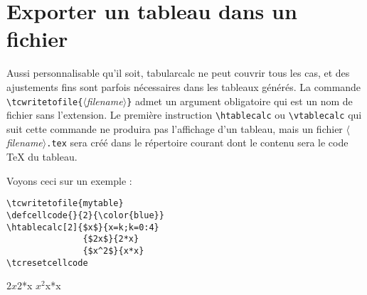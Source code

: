 \documentclass[a4paper,10pt]{article}
\newcommand\argu[1]{$\langle$\textit{#1}$\rangle$}
\newcommand\ARGU[1]{\texttt{\{}\argu{#1}\texttt{\}}}
\newcommand\tbcalc{\textsf{tabularcalc}\xspace}
\newcommand\verbinline{\lstinline[breaklines=false,basicstyle=\normalsize\ttfamily]}
\newcommand\mywidth{0.85\linewidth}
\begin{document}
\section{Exporter un tableau dans un fichier}
Aussi personnalisable qu'il soit, \tbcalc ne peut couvrir tous les cas, et des ajustements fins sont parfois nécessaires dans les tableaux générés. La commande \verbinline=\tcwritetofile=\ARGU{filename} admet un argument obligatoire qui est un nom de fichier sans l'extension. Le première instruction \verbinline=\htablecalc= ou \verbinline=\vtablecalc= qui suit cette commande ne produira pas l'affichage d'un tableau, mais un fichier \argu{filename}\verb|.tex| sera créé dans le répertoire courant dont le contenu sera le code \TeX{} du tableau.\medskip

Voyons ceci sur un exemple :
\begin{center}
\begin{minipage}{\mywidth}
\begin{lstlisting}
\tcwritetofile{mytable}
\defcellcode{}{2}{\color{blue}}
\htablecalc[2]{$x$}{x=k;k=0:4}
               {$2x$}{2*x}
               {$x^2$}{x*x}
\tcresetcellcode
\end{lstlisting}
\end{minipage}
\end{center}
               {$2x$}{2*x}
               {$x^2$}{x*x}
\tcresetcellcode
\end{document}
